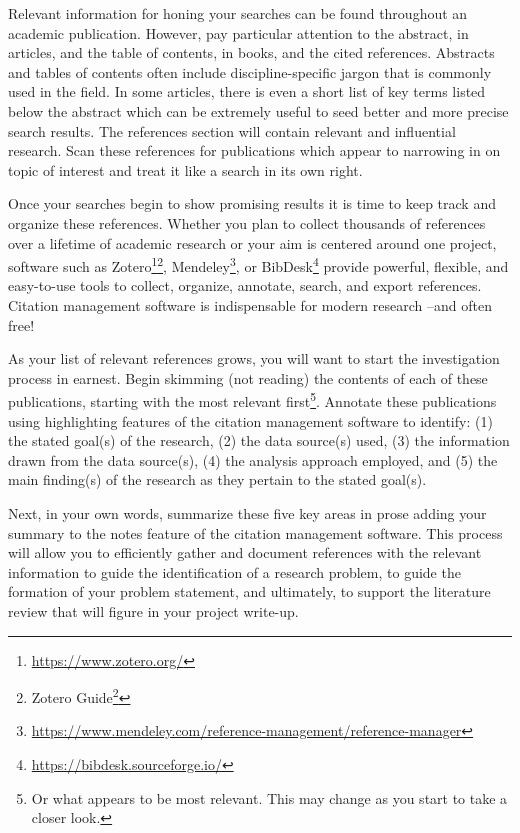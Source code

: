 \documentclass[
  letterpaper,
]{latex/krantz}
\theoremstyle{definition}
\theoremstyle{remark}
\DeclareRobustCommand{\href}[2]{#2\footnote{\url{#1}}}
\begin{document}
Relevant information for honing your searches can be found throughout an
academic publication. However, pay particular attention to the abstract,
in articles, and the table of contents, in books, and the cited
references. Abstracts and tables of contents often include
discipline-specific jargon that is commonly used in the field. In some
articles, there is even a short list of key terms listed below the
abstract which can be extremely useful to seed better and more precise
search results. The references section will contain relevant and
influential research. Scan these references for publications which
appear to narrowing in on topic of interest and treat it like a search
in its own right.

Once your searches begin to show promising results it is time to keep
track and organize these references. Whether you plan to collect
thousands of references over a lifetime of academic research or your aim
is centered around one project, software such as
\href{https://www.zotero.org/}{Zotero}\footnote{\href{https://guides.zsr.wfu.edu/zotero}{Zotero
  Guide}},
\href{https://www.mendeley.com/reference-management/reference-manager}{Mendeley},
or \href{https://bibdesk.sourceforge.io/}{BibDesk} provide powerful,
flexible, and easy-to-use tools to collect, organize, annotate, search,
and export references. Citation management software is indispensable for
modern research --and often free!

As your list of relevant references grows, you will want to start the
investigation process in earnest. Begin skimming (not reading) the
contents of each of these publications, starting with the most relevant
first\footnote{Or what appears to be most relevant. This may change as
  you start to take a closer look.}. Annotate these publications using
highlighting features of the citation management software to identify:
(1) the stated goal(s) of the research, (2) the data source(s) used, (3)
the information drawn from the data source(s), (4) the analysis approach
employed, and (5) the main finding(s) of the research as they pertain to
the stated goal(s).

Next, in your own words, summarize these five key areas in prose adding
your summary to the notes feature of the citation management software.
This process will allow you to efficiently gather and document
references with the relevant information to guide the identification of
a research problem, to guide the formation of your problem statement,
and ultimately, to support the literature review that will figure in
your project write-up.
\end{document}

